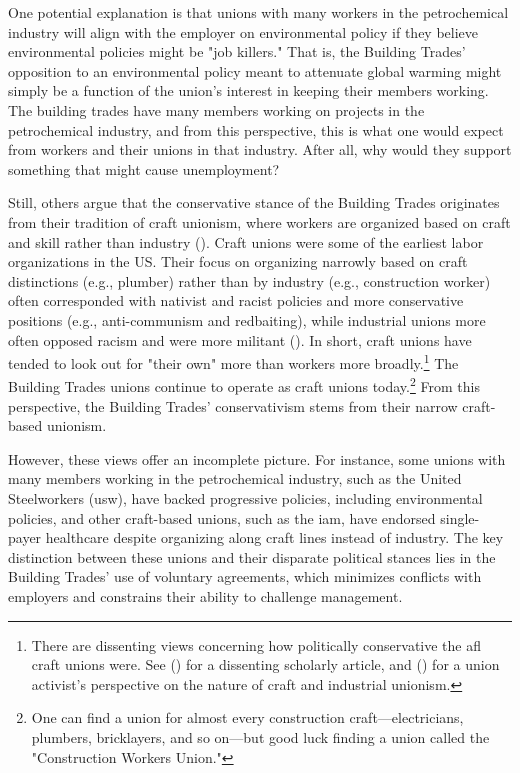 \documentclass[12pt]{article}
\begin{document}
One potential explanation is that unions with many workers in the petrochemical industry will align with the employer on environmental policy if they believe environmental policies might be "job killers." That is, the Building Trades' opposition to an environmental policy meant to attenuate global warming might simply be a function of the union's interest in keeping their members working. The building trades have many members working on projects in the petrochemical industry, and from this perspective, this is what one would expect from workers and their unions in that industry. After all, why would they support something that might cause unemployment?

Still, others argue that the conservative stance of the Building Trades originates from their tradition of craft unionism, where workers are organized based on craft and skill rather than industry (\cite{roginComment1974, perlmanHistoryTradeUnionism1922, issermanGodBlessOur1976, fonerHistoryLaborMovement1996}). Craft unions were some of the earliest labor organizations in the US. Their focus on organizing narrowly based on craft distinctions (e.g., plumber) rather than by industry (e.g., construction worker) often corresponded with nativist and racist policies and more conservative positions (e.g., anti-communism and redbaiting), while industrial unions more often opposed racism and were more militant (\cite{fonerHistoryLaborMovement1994}). In short, craft unions have tended to look out for "their own" more than workers more broadly.\footnote{There are dissenting views concerning how politically conservative the \acrshort{afl} craft unions were. See \citeauthor{cobblePureSimpleRadicalism2013} (\citeyear{cobblePureSimpleRadicalism2013}) for a dissenting scholarly article, and \citeauthor{parkerAreIndustrialUnions2008} (\citeyear{parkerAreIndustrialUnions2008}) for a union activist's perspective on the nature of craft and industrial unionism.} The Building Trades unions continue to operate as craft unions today.\footnote{One can find a union for almost every construction craft---electricians, plumbers, bricklayers, and so on---but good luck finding a union called the "Construction Workers Union."} From this perspective, the Building Trades' conservativism stems from their narrow craft-based unionism.

However, these views offer an incomplete picture. For instance, some unions with many members working in the petrochemical industry, such as the United Steelworkers (\acrshort{usw}), have backed progressive policies, including environmental policies, and other craft-based unions, such as the \acrfull{iam}, have endorsed single-payer healthcare despite organizing along craft lines instead of industry. The key distinction between these unions and their disparate political stances lies in the Building Trades' use of voluntary agreements, which minimizes conflicts with employers and constrains their ability to challenge management.
\end{document}
